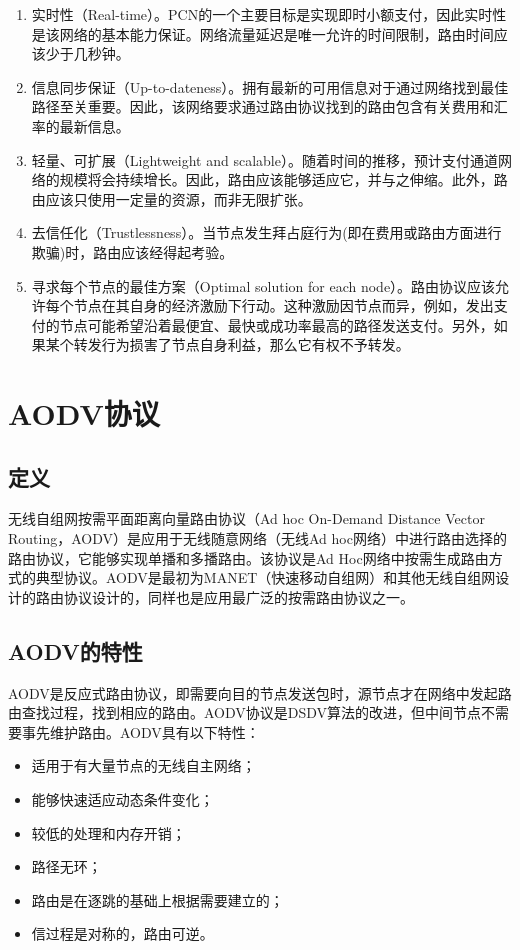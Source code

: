 \documentclass[12pt,a4paper]{article}
\begin{document}
\begin{enumerate}
	\item 实时性（Real-time）。PCN的一个主要目标是实现即时小额支付，因此实时性是该网络的基本能力保证。网络流量延迟是唯一允许的时间限制，路由时间应该少于几秒钟。

	\item 信息同步保证（Up-to-dateness）。拥有最新的可用信息对于通过网络找到最佳路径至关重要。因此，该网络要求通过路由协议找到的路由包含有关费用和汇率的最新信息。

	\item 轻量、可扩展（Lightweight and scalable）。随着时间的推移，预计支付通道网络的规模将会持续增长。因此，路由应该能够适应它，并与之伸缩。此外，路由应该只使用一定量的资源，而非无限扩张。

	\item 去信任化（Trustlessness）。当节点发生拜占庭行为(即在费用或路由方面进行欺骗)时，路由应该经得起考验。

	\item 寻求每个节点的最佳方案（Optimal solution for each node）。路由协议应该允许每个节点在其自身的经济激励下行动。这种激励因节点而异，例如，发出支付的节点可能希望沿着最便宜、最快或成功率最高的路径发送支付。另外，如果某个转发行为损害了节点自身利益，那么它有权不予转发。
\end{enumerate}
\clearpage

\section{AODV协议}

\subsection{定义}
无线自组网按需平面距离向量路由协议（Ad hoc On-Demand Distance Vector Routing，AODV）是应用于无线随意网络（无线Ad hoc网络）中进行路由选择的路由协议，它能够实现单播和多播路由\cite{Perkins2003}。该协议是Ad Hoc网络中按需生成路由方式的典型协议。AODV是最初为MANET\cite{cs441_manet}（快速移动自组网）和其他无线自组网设计的路由协议设计的，同样也是应用最广泛的按需路由协议之一。

\subsection{AODV的特性}
AODV是反应式路由协议，即需要向目的节点发送包时，源节点才在网络中发起路由查找过程，找到相应的路由。AODV协议是DSDV算法的改进，但中间节点不需要事先维护路由。AODV具有以下特性：
\begin{itemize}
	\item 适用于有大量节点的无线自主网络；
	\item 能够快速适应动态条件变化；
	\item 较低的处理和内存开销；
	\item 路径无环；
	\item 路由是在逐跳的基础上根据需要建立的；
	\item 信过程是对称的，路由可逆。
\end{itemize}
\end{document}
